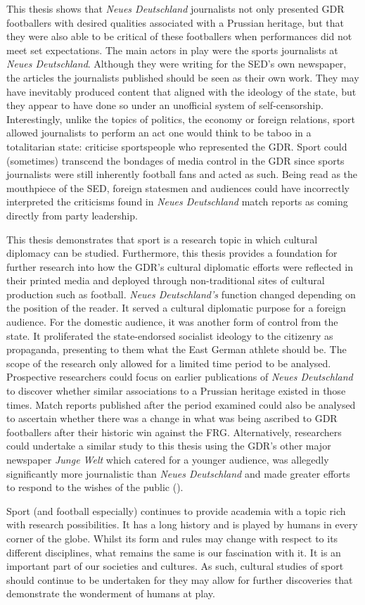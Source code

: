 This thesis shows that \textit{Neues Deutschland} journalists not only presented GDR footballers with desired qualities associated with a Prussian heritage, but that they were also able to be critical of these footballers when performances did not meet set expectations. The main actors in play were the sports journalists at \textit{Neues Deutschland}. Although they were writing for the SED’s own newspaper, the articles the journalists published should be seen as their own work. They may have inevitably produced content that aligned with the ideology of the state, but they appear to have done so under an unofficial system of self-censorship. Interestingly, unlike the topics of politics, the economy or foreign relations, sport allowed journalists to perform an act one would think to be taboo in a totalitarian state: criticise sportspeople who represented the GDR. Sport could (sometimes) transcend the bondages of media control in the GDR since sports journalists were still inherently football fans and acted as such. Being read as the mouthpiece of the SED, foreign statesmen and audiences could have incorrectly interpreted the criticisms found in \textit{Neues Deutschland} match reports as coming directly from party leadership.

This thesis demonstrates that sport is a research topic in which cultural diplomacy can be studied. Furthermore, this thesis provides a foundation for further research into how the GDR’s cultural diplomatic efforts were reflected in their printed media and deployed through non-traditional sites of cultural production such as football. \textit{Neues Deutschland’s} function changed depending on the position of the reader. It served a cultural diplomatic purpose for a foreign audience. For the domestic audience, it was another form of control from the state. It proliferated the state-endorsed socialist ideology to the citizenry as propaganda, presenting to them what the East German athlete should be. The scope of the research only allowed for a limited time period to be analysed. Prospective researchers could focus on earlier publications of \textit{Neues Deutschland} to discover whether similar associations to a Prussian heritage existed in those times. Match reports published after the period examined could also be analysed to ascertain whether there was a change in what was being ascribed to GDR footballers after their historic win against the FRG. Alternatively, researchers could undertake a similar study to this thesis using the GDR’s other major newspaper \textit{Junge Welt} which catered for a younger audience, was allegedly significantly more journalistic than \textit{Neues Deutschland} and made greater efforts to respond to the wishes of the public (\cite{meyenschweiger2008}).

Sport (and football especially) continues to provide academia with a topic rich with research possibilities. It has a long history and is played by humans in every corner of the globe. Whilst its form and rules may change with respect to its different disciplines, what remains the same is our fascination with it. It is an important part of our societies and cultures. As such, cultural studies of sport should continue to be undertaken for they may allow for further discoveries that demonstrate the wonderment of humans at play.